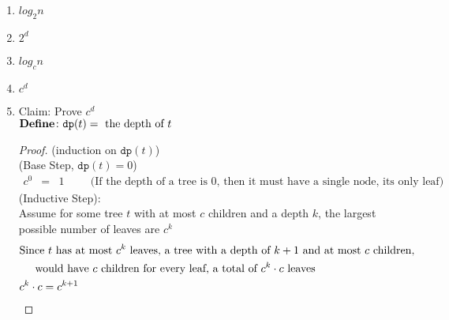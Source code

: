 \documentclass{article}
\begin{document}
\begin{enumerate}
\begin{enumerate}
\begin{proof}
\begin{align}
                &\texttt{ed}(T_1) + 1 + \texttt{ed}(T_2) + 1 + 1 = \texttt{ed}(T_1) + \texttt{ed}(T_2) + 2 + 1 = \texttt{ed}(T) + 1
            \end{align}
        \end{proof}
        \item $log_2n$
        \item $2^d$
        \item $log_cn$
        \item $c^d$
        \item Claim: Prove $c^d$ \\
        $\bold{Define} \colon \texttt{dp}(t) = \text{ the depth of } t$
        \begin{proof}
            (induction on $\texttt{dp}(t)$) \\
            (Base Step, $\texttt{dp}(t) = 0$)
            \begin{eqnarray}
                c^0 &=& 1 \hspace{1cm} \text{(If the depth of a tree is $0$, then it must have a single node, its only leaf)}
            \end{eqnarray}
            (Inductive Step): \\
            Assume for some tree $t$ with at most $c$ children and a depth $k$, the largest possible number of leaves are $c^k$
            \begin{align}
                &\text{Since } t \text{ has at most } c^k \text{ leaves, a tree with a depth of } k+1 \text{ and at most } c \text{ children,} \\
                &\hspace{0.5cm} \text{would have } c \text{ children for every leaf, a total of } c^k \cdot c \text{ leaves} \\
                &c^k \cdot c = c^{k+1}
            \end{align}
        \end{proof}
    \end{enumerate}
\end{enumerate}
\end{document}
